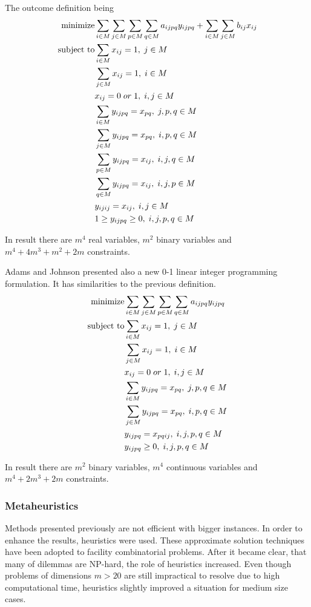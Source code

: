 The outcome definition being
\begin{align}
  \text{minimize} &\null \sum_{i \in M} \sum_{j \in M} \sum_{p \in M} \sum_{q \in M} a_{ijpq}y_{ijpq} + \sum_{i \in M} \sum_{j \in M} b_{ij} x_{ij} \\
  \text{subject to} &\null \sum_{i \in M} x_{ij} = 1, \; j \in M \\
  &\null \sum_{j \in M} x_{ij} = 1, \; i \in M \\
  &\null x_{ij} = 0 \; or \; 1, \; i, j \in M \\
  &\null \sum_{i \in M} y_{ijpq} = x_{pq}, \; j, p, q \in M \\
  &\null \sum_{j \in M} y_{ijpq} = x_{pq}, \; i, p, q \in M \\
  &\null \sum_{p \in M} y_{ijpq} = x_{ij}, \; i, j, q \in M \\
  &\null \sum_{q \in M} y_{ijpq}= x_{ij}, \; i, j, p \in M \\
  &\null y_{ijij} = x_{ij}, \; i, j \in M \\
  &\null 1 \geq y_{ijpq} \geq 0, \; i, j, p, q \in M
\end{align}

In result there are $m^4$ real variables, $m^2$ binary variables and $m^4 + 4m^3+m^2+2m$ constraints.

Adams and Johnson \cite{adams1994improved} presented also a new 0-1 linear integer programming formulation.
It has similarities to the previous definition.
\begin{align}
  \text{minimize} &\null \sum_{i \in M} \sum_{j \in M} \sum_{p \in M} \sum_{q \in M} a_{ijpq}y_{ijpq} \\
  \text{subject to} &\null \sum_{i \in M} x_{ij} = 1, \; j \in M \\
  &\null \sum_{j \in M} x_{ij} = 1, \; i \in M \\
  &\null x_{ij} = 0 \; or \; 1, \; i, j \in M \\
  &\null \sum_{i \in M} y_{ijpq} = x_{pq}, \; j, p, q \in M \\
  &\null \sum_{j \in M} y_{ijpq} = x_{pq}, \; i, p, q \in M \\
  &\null y_{ijpq} = x_{pqij}, \; i, j, p, q \in M \\
  &\null y_{ijpq} \geq 0, \; i, j, p, q \in M
\end{align}

In result there are $m^2$ binary variables, $m^4$ continuous variables and $m^4+2m^3+2m$ constraints.

\subsubsection{Metaheuristics}
Methods presented previously are not efficient with bigger instances.
In order to enhance the results, heuristics were used.
These approximate solution techniques have been adopted to facility combinatorial problems.
After it became clear, that many of dilemmas are NP-hard, the role of heuristics increased.
Even though problems of dimensions $m > 20$ are still impractical to resolve due to high computational time, heuristics slightly improved a situation for medium size cases.

